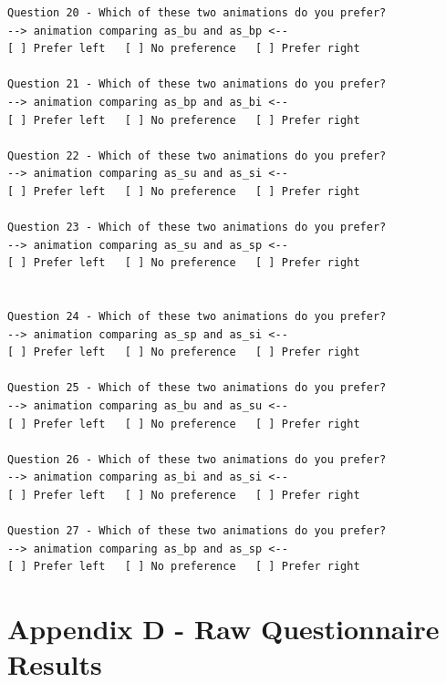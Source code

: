 \documentclass[]{article}
\begin{document}
\begin{Verbatim}[breaklines]
Question 20 - Which of these two animations do you prefer?
--> animation comparing as_bu and as_bp <--
[ ] Prefer left   [ ] No preference   [ ] Prefer right

Question 21 - Which of these two animations do you prefer?
--> animation comparing as_bp and as_bi <--
[ ] Prefer left   [ ] No preference   [ ] Prefer right

Question 22 - Which of these two animations do you prefer?
--> animation comparing as_su and as_si <--
[ ] Prefer left   [ ] No preference   [ ] Prefer right

Question 23 - Which of these two animations do you prefer?
--> animation comparing as_su and as_sp <--
[ ] Prefer left   [ ] No preference   [ ] Prefer right


Question 24 - Which of these two animations do you prefer?
--> animation comparing as_sp and as_si <--
[ ] Prefer left   [ ] No preference   [ ] Prefer right

Question 25 - Which of these two animations do you prefer?
--> animation comparing as_bu and as_su <--
[ ] Prefer left   [ ] No preference   [ ] Prefer right

Question 26 - Which of these two animations do you prefer?
--> animation comparing as_bi and as_si <--
[ ] Prefer left   [ ] No preference   [ ] Prefer right

Question 27 - Which of these two animations do you prefer?
--> animation comparing as_bp and as_sp <--
[ ] Prefer left   [ ] No preference   [ ] Prefer right
\end{Verbatim}

\bigskip

\section{Appendix D - Raw Questionnaire Results}\label{appendix-d}
\end{document}
